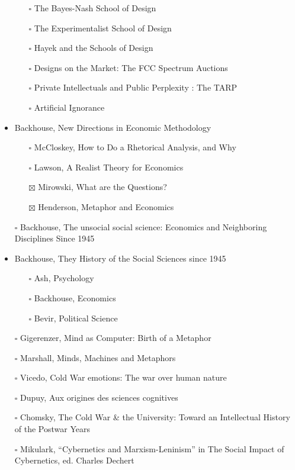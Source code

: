 \documentclass[paper=B6,portrait,twoside=true,twocolumn=false,headinclude=true,footinclude=false,fontsize=12,BCOR=10mm,DIV=calc,pagesize=auto,titlepage=firstiscover,mpinclude=false,headings=normal,headings=twolinechapter,open=right,toc=graduated,chapterprefix=false,numbers=endperiod,parskip=half+]{scrbook}
\theoremstyle{definition}
\begin{document}
\begin{itemize}
\begin{itemize}
\item[{$\square$}] The Bayes-Nash School of Design
\item[{$\square$}] The Experimentalist School of Design
\item[{$\square$}] Hayek and the Schools of Design
\item[{$\square$}] Designs on the Market: The FCC Spectrum Auctions
\item[{$\square$}] Private Intellectuals and Public Perplexity : The TARP
\item[{$\square$}] Artificial Ignorance
\end{itemize}
\item\relax [2/4] Backhouse, New Directions in Economic Methodology
\begin{itemize}
\item[{$\square$}] McCloskey, How to Do a Rhetorical Analysis, and Why
\item[{$\square$}] Lawson, A Realist Theory for Economics
\item[{$\boxtimes$}] Mirowski, What are the Questions?
\item[{$\boxtimes$}] Henderson, Metaphor and Economics
\end{itemize}
\item[{$\square$}] Backhouse, The unsocial social science: Economics and Neighboring Disciplines Since 1945
\item\relax [0/3] Backhouse, They History of the Social Sciences since 1945
\begin{itemize}
\item[{$\square$}] Ash, Psychology
\item[{$\square$}] Backhouse, Economics
\item[{$\square$}] Bevir, Political Science
\end{itemize}
\item[{$\square$}] Gigerenzer, Mind as Computer: Birth of a Metaphor
\item[{$\square$}] Marshall, Minds, Machines and Metaphors
\item[{$\square$}] Vicedo, Cold War emotions: The war over human nature
\item[{$\square$}] Dupuy, Aux origines des sciences cognitives
\item[{$\square$}] Chomsky, The Cold War \& the University: Toward an Intellectual History of the Postwar Years
\item[{$\square$}] Mikulark, ``Cybernetics and Marxism-Leninism'' in The Social Impact of Cybernetics, ed. Charles Dechert

\end{itemize}
\end{document}

